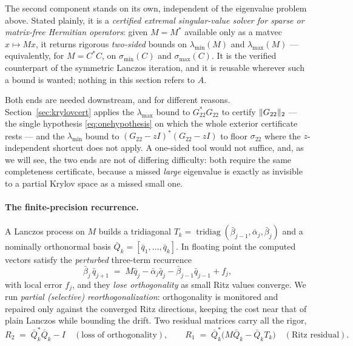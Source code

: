 \documentclass[11pt]{article}
\newcommand{\sig}{\sigma}
\newcommand{\sigmin}{\sigma_{\min}}
\newcommand{\sigmax}{\sigma_{\max}}
\DeclarePairedDelimiter{\norm}{\lVert}{\rVert}
\begin{document}
The second component stands on its own, independent of the eigenvalue problem above. Stated plainly,
it is a \emph{certified extremal singular-value solver for sparse or matrix-free Hermitian operators}:
given $M=M^*$ available only as a matvec $x\mapsto Mx$, it returns rigorous \emph{two-sided} bounds on
$\lambda_{\min}(M)$ and $\lambda_{\max}(M)$ --- equivalently, for $M=C^*C$, on $\sigmin(C)$ and
$\sigmax(C)$. It is the verified counterpart of the symmetric Lanczos iteration, and it is reusable
wherever such a bound is wanted; nothing in this section refers to $A$.

Both ends are needed downstream, and for different reasons. Section~\ref{sec:krylovcert} applies the
$\lambda_{\max}$ bound to $G_{22}^*G_{22}$ to certify $\norm{G_{22}}_2$ --- the single hypothesis
\eqref{eq:onehypothesis} on which the whole exterior certificate rests --- and the $\lambda_{\min}$
bound to $(G_{22}-zI)^*(G_{22}-zI)$ to floor $\sig_{22}$ where the $z$-independent shortcut does not
apply. A one-sided tool would not suffice, and, as we will see, the two ends are not of differing
difficulty: both require the same completeness certificate, because a missed \emph{large} eigenvalue
is exactly as invisible to a partial Krylov space as a missed small one.

\paragraph{The finite-precision recurrence.} A Lanczos process on $M$ builds a tridiagonal
$T_k=\operatorname{tridiag}(\bar\beta_{j-1},\bar\alpha_j,\bar\beta_j)$ and a nominally orthonormal
basis $\bar Q_k=[\bar q_1,\dots,\bar q_k]$. In floating point the computed vectors satisfy the
\emph{perturbed} three-term recurrence
\begin{equation}\label{eq:lanczosrec}
  \bar\beta_j\,\bar q_{j+1}\;=\;M\bar q_j-\bar\alpha_j\bar q_j-\bar\beta_{j-1}\bar q_{j-1}+f_j,
\end{equation}
with local error $f_j$, and they \emph{lose orthogonality} as small Ritz values converge. We run
\emph{partial (selective) reorthogonalization}: orthogonality is monitored and repaired only against
the converged Ritz directions, keeping the cost near that of plain Lanczos while bounding the drift.
Two residual matrices carry all the rigor,
\begin{equation}\label{eq:lanczosres}
  R_2\;=\;\bar Q_k^*\bar Q_k-I \quad(\text{loss of orthogonality}),\qquad
  R_1\;=\;\bar Q_k^*\big(M\bar Q_k-\bar Q_kT_k\big)\quad(\text{Ritz residual}).
\end{equation}
\end{document}
